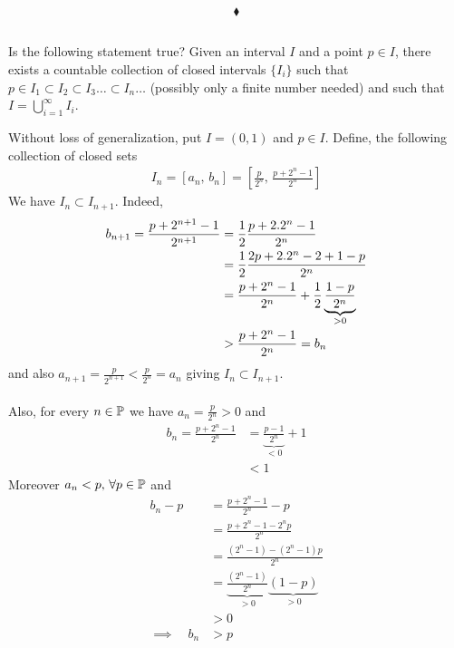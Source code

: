 $$\blacklozenge$$

\subsection{}
\begin{tcolorbox}
Is the following statement true? Given an interval $I$ and a point $p\in I$, there exists a countable collection of closed intervals $\{I_i\}$ such that $p\in I_1\subset I_2\subset I_3\dots \subset I_n\dots $ (possibly only a finite number needed) and such that $I=\bigcup^{\infty}_{i=1}I_i$.
\end{tcolorbox}
Without loss of generalization, put $I=(0,1)$ and $p\in I$. Define, the following collection of closed sets
\begin{align*}
I_n=\left[a_n,\, b_n\right]=\left[\frac{p}{2^n},\, \frac{p+2^n-1}{2^n}\right]
\end{align*}
We have $I_n\subset I_{n+1}$. Indeed,
\begin{align*}
b_{n+1}=\frac{p+2^{n+1}-1}{2^{n+1}}&=\frac{1}{2} \frac{p+2.2^{n}-1}{2^{n}}\\
&= \frac{1}{2} \frac{2p+2.2^{n}-2+1-p}{2^{n}}\\
&=  \frac{p+2^{n}-1}{2^{n}}+\frac{1}{2} \underbrace{\frac{1-p}{2^{n}}}_{>0}\\
&>\frac{p+2^{n}-1}{2^{n}}=b_n
\end{align*}
and also $a_{n+1}=\frac{p}{2^{n+1}}<\frac{p}{2^n}=a_n$ giving $I_n\subset I_{n+1}$.\\\\
Also, for every $n\in\mathbb{P} $ we have $a_n=\frac{p}{2^n}>0$ and 
\begin{align*}
b_n=\frac{p+2^{n}-1}{2^{n}}&= \underbrace{\frac{p-1}{2^{n}}}_{<0}+1\\
&< 1
\end{align*}
Moreover $a_n< p,\, \forall p\in \mathbb{P}$ and 
\begin{align*}
b_n-p&=\frac{p+2^{n}-1}{2^{n}}-p\\
&= \frac{p+2^{n}-1-2^np}{2^{n}}\\
&= \frac{(2^{n}-1)-(2^n-1)p}{2^{n}}\\
&= \underbrace{\frac{(2^{n}-1)}{2^{n}}}_{>0}\underbrace{(1-p)}_{>0}\\
&>0\\
\implies \quad b_n&>p
\end{align*}
